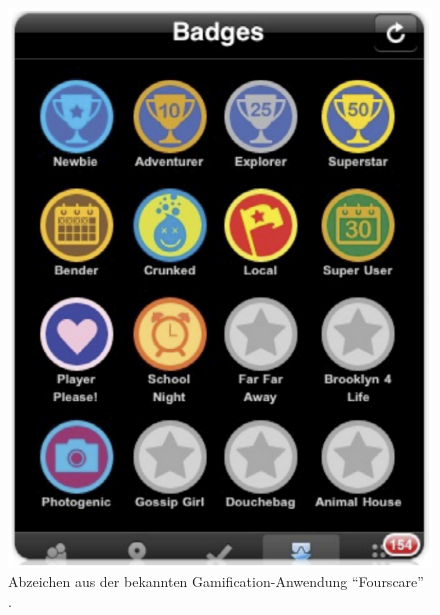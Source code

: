\documentclass[a4paper,12pt]{scrartcl}
\begin{document}
\\
\begin{figure}[h!]
\begin{center}
\includegraphics[scale = 0.45]{Bilder/Abzeichen.eps}
\caption{Abzeichen aus der bekannten Gamification-Anwendung \enquote{Fourscare} \cite{Zichermann2011}.}
\label{RanglistenBild}
\end{center}
\end{figure} 
\end{document}

